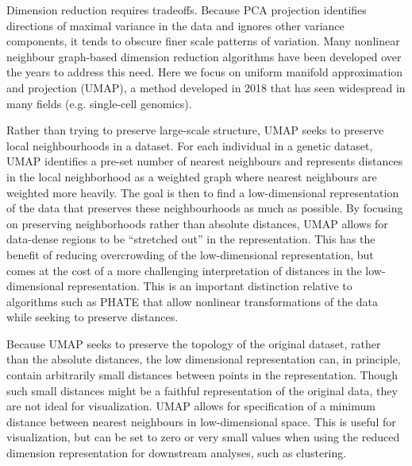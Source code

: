 \documentclass[12pt]{article}
\newcommand{\adpcomment}[1]{{\textcolor{orange}{ADP: #1}}}
\begin{document}
Dimension reduction requires tradeoffs. Because PCA projection identifies directions of maximal variance in the data and ignores other variance components, it tends to obscure finer scale patterns of variation.  Many nonlinear neighbour graph-based dimension reduction algorithms have been developed over the years to address this need. Here we focus on uniform manifold approximation and projection (UMAP)\cite{mcinnes_umap_2018}, a method developed in 2018 that has seen widespread in many fields (e.g. single-cell genomics\cite{becht_dimensionality_2019}). 

Rather than trying to preserve large-scale structure, UMAP seeks to preserve local neighbourhoods in a dataset. For each individual in a genetic dataset, UMAP identifies a pre-set number of nearest neighbours and represents distances in the local neighborhood as a weighted graph where nearest neighbours are weighted more heavily. The goal is then to find a low-dimensional representation of the data that preserves these neighbourhoods as much as possible. By focusing on preserving neighborhoods rather than absolute distances, UMAP allows for data-dense regions to be ``stretched out'' in the representation. This has the benefit of reducing overcrowding of the low-dimensional representation, but comes at the cost of a more challenging interpretation of distances in the low-dimensional representation.  This is an important distinction relative to algorithms such as PHATE \cite{moon2019visualizing} that allow nonlinear transformations of the data while seeking to preserve distances. 

Because UMAP seeks to preserve the topology of the original dataset, rather than the absolute distances, the low dimensional representation can, in principle, contain arbitrarily small distances between points in the representation. Though such small distances might be a faithful representation of the original data, they are not ideal for visualization. UMAP allows for specification of a minimum distance between nearest neighbours in low-dimensional space. This is useful for visualization, but can be set to zero or very small values when using the reduced dimension representation for downstream analyses, such as clustering.



\end{document}
